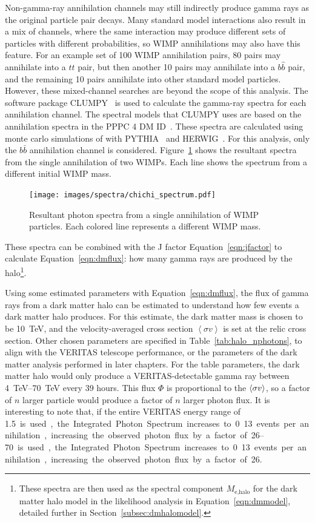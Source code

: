     Non-gamma-ray annihilation channels may still indirectly produce gamma rays as the original particle pair decays.
    Many standard model interactions also result in a mix of channels, where the same interaction may produce different sets of particles with different probabilities, so WIMP annihilations may also have this feature.
    For an example set of 100 WIMP annihilation pairs, 80 pairs may annihilate into a $t\hat{t}$ pair, but then another 10 pairs may annihilate into a $b\hat{b}$ pair, and the remaining 10 pairs annihilate into other standard model particles.
    However, these mixed-channel searches are beyond the scope of this analysis.
    The software package CLUMPY~\cite{CLUMPYcode} is used to calculate the gamma-ray spectra for each annihilation channel.
    The spectral models that CLUMPY uses are based on the annihilation spectra in the PPPC 4 DM ID~\cite{pppc4_dm_spectra,pppc4_ewcorrections}.
    These spectra are calculated using monte carlo simulations of with PYTHIA~\cite{pythia} and HERWIG~\cite{herwig}.
    For this analysis, only the $b\bar{b}$ annihilation channel is considered.
    Figure~\ref{fig:chichi_spectrum} shows the resultant spectra from the single annihilation of two WIMPs.
    Each line shows the spectrum from a different initial WIMP mass.

    \begin{figure}[ht]
      \centering
      \texttt{[image: images/spectra/chichi\_spectrum.pdf]}
      \caption[Single Annihilation Spectra]{
        Resultant photon spectra from a single annihilation of WIMP particles.
        Each colored line represents a different WIMP mass.
      }
      \label{fig:chichi_spectrum}
    \end{figure}

    These spectra can be combined with the J factor Equation~\ref{eqn:jfactor} to calculate Equation~\ref{eqn:dmflux}: how many gamma rays are produced by the halo\footnote{
      These spectra are then used as the spectral component $M_{\textrm{e,halo}}$ for the dark matter halo model in the likelihood analysis in Equation~\ref{eqn:dmmodel}, detailed further in Section~\ref{subsec:dmhalomodel}.
    }.
    
    Using some estimated parameters with Equation~\ref{eqn:dmflux}, the flux of gamma rays from a dark matter halo can be estimated to understand how few events a dark matter halo produces.
    For this estimate, the dark matter mass is chosen to be \SI{10}{TeV}, and the velocity-averaged cross section $\left < \sigma v \right >$ is set at the relic cross section.
    Other chosen parameters are specified in Table~\ref{tab:halo_nphotons}, to align with the VERITAS telescope performance, or the parameters of the dark matter analysis performed in later chapters.
    For the table parameters, the dark matter halo would only produce a VERITAS-detectable gamma ray between \SIrange{4}{70}{TeV} every 39 hours.
    This flux $\Phi$ is proportional to the $\left < \sigma v \right >$, so a factor of $n$ larger particle would produce a factor of $n$ larger photon flux.
    It is interesting to note that, if the entire VERITAS energy range of \SIrange{1.5}{70} is used, the Integrated Photon Spectrum increases to 0.13 events per annihilation, increasing the observed photon flux by a factor of 26.
    
